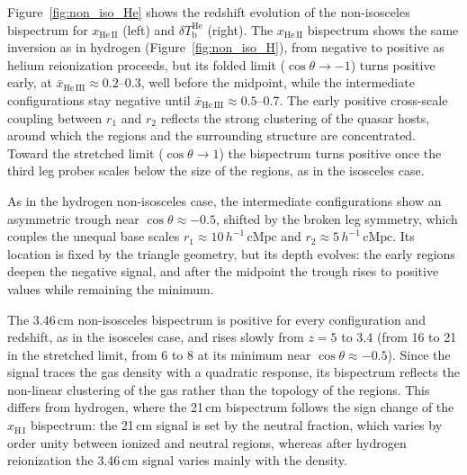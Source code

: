 
Figure~\ref{fig:non_iso_He} shows the redshift evolution of the non-isosceles bispectrum for $x_\mathrm{He\,II}$ (left) and $\delta T_\mathrm{b}^\mathrm{He}$ (right). The $x_\mathrm{He\,II}$ bispectrum shows the same inversion as in hydrogen (Figure~\ref{fig:non_iso_H}), from negative to positive as helium reionization proceeds, but its folded limit ($\cos\theta \to -1$) turns positive early, at $\bar{x}_\mathrm{He\,III} \approx 0.2$--0.3, well before the midpoint, while the intermediate configurations stay negative until $\bar{x}_\mathrm{He\,III} \approx 0.5$--0.7. The early positive cross-scale coupling between $r_1$ and $r_2$ reflects the strong clustering of the quasar hosts, around which the  regions and the surrounding  structure are concentrated. Toward the stretched limit ($\cos\theta \to 1$) the bispectrum turns positive once the third leg probes scales below the size of the  regions, as in the isosceles case.

As in the hydrogen non-isosceles case, the intermediate configurations show an asymmetric trough near $\cos\theta \approx -0.5$, shifted by the broken leg symmetry, which couples the unequal base scales $r_1 \approx 10\,h^{-1}\,\mathrm{cMpc}$ and $r_2 \approx 5\,h^{-1}\,\mathrm{cMpc}$. Its location is fixed by the triangle geometry, but its depth evolves: the early  regions deepen the negative signal, and after the midpoint the trough rises to positive values while remaining the minimum.

The 3.46\,cm non-isosceles bispectrum is positive for every configuration and redshift, as in the isosceles case, and rises slowly from $z = 5$ to 3.4 (from 16 to 21 in the stretched limit, from 6 to 8 at its minimum near $\cos\theta \approx -0.5$). Since the signal traces the gas density with a quadratic response, its bispectrum reflects the non-linear clustering of the gas rather than the topology of the  regions. This differs from hydrogen, where the 21\,cm bispectrum follows the sign change of the $x_\mathrm{H\,I}$ bispectrum: the 21\,cm signal is set by the neutral fraction, which varies by order unity between ionized and neutral regions, whereas after hydrogen reionization the 3.46\,cm signal varies mainly with the density.


